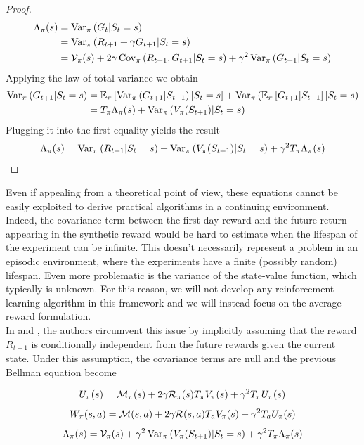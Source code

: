 \begin{proof}
\begin{equation*}
\begin{split}
		\Lambda_\pi(s) &= \Var[\pi]{G_t | S_t = s}\\
					   &= \Var[\pi]{R_{t+1} + \gamma G_{t+1} | S_t = s}\\
					   &= \mathcal{V}_\pi(s) + 2 \gamma \Cov[\pi]{R_{t+1}, G_{t+1} | S_t = s} + \gamma^2 \Var[\pi]{G_{t+1} | S_t = s}\\
\end{split}
\end{equation*}
Applying the law of total variance we obtain
\begin{equation*}
	\begin{split}
	\Var[\pi]{G_{t+1} | S_t = s} &= \E[\pi]{ \Var[\pi]{G_{t+1} | S_{t+1}} | S_t = s} + \Var[\pi]{\E[\pi]{G_{t+1} | S_{t+1}} | S_t = s}\\
	&= T_\pi \Lambda_\pi(s) + \Var[\pi]{V_\pi(S_{t+1}) | S_t = s}
	\end{split}
\end{equation*}
Plugging it into the first equality yields the result
\begin{equation*}
	\Lambda_\pi(s) = \Var[\pi]{R_{t+1} | S_t = s} + \Var[\pi]{V_\pi(S_{t+1}) | S_t = s} + \gamma^2 T_\pi \Lambda_\pi(s)
\end{equation*}
\end{proof}
Even if appealing from a theoretical point of view, these equations cannot be easily exploited to derive practical algorithms in a continuing environment. Indeed, the covariance term between the first day reward and the future return appearing in the synthetic reward would be hard to estimate when the lifespan of the experiment can be infinite. This doesn't necessarily represent a problem in an episodic environment, where the experiments have a finite (possibly random) lifespan. Even more problematic is the variance of the state-value function, which typically is unknown. For this reason, we will not develop any reinforcement learning algorithm in this framework and we will instead focus on the average reward formulation.\\
In \cite{tamar2012policy} and \cite{prashanth2014actor}, the authors circumvent this issue by implicitly assuming that the reward $R_{t+1}$ is conditionally independent from the future rewards given the current state. Under this assumption, the covariance terms are null and the previous Bellman equation become 
\begin{corollary}
	\begin{equation}
		U_\pi(s) = \calM_\pi(s) + 2\gamma \calR_\pi(s) T_\pi V_\pi(s) + \gamma^2 T_\pi U_\pi(s)
	\end{equation}
	\begin{equation}
		W_\pi(s,a) = \calM(s,a) + 2\gamma \calR(s,a) T_a V_\pi(s) + \gamma^2 T_a U_\pi(s)
	\end{equation}
	\begin{equation}
		\Lambda_\pi(s) = \mathcal{V}_\pi(s) + \gamma^2 \Var[\pi]{V_\pi(S_{t+1}) | S_t = s} + \gamma^2 T_\pi \Lambda_\pi(s)	
	\end{equation}
\end{corollary}

